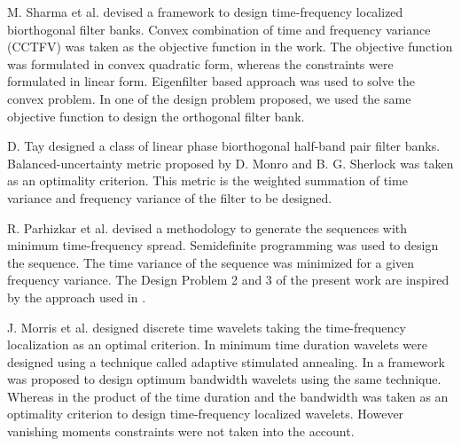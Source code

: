 M. Sharma et al. \cite{CSSP} devised a framework to design time-frequency localized biorthogonal filter banks. Convex combination of time and frequency variance (CCTFV) was taken as the objective function in the work. The objective function was formulated in convex quadratic form, whereas the constraints were formulated in linear form. Eigenfilter based approach was used to solve the convex problem. In one of the design problem proposed, we used the same objective function to design the orthogonal filter bank.

D. Tay \cite{key-2,key-28} designed a class of linear phase biorthogonal half-band pair filter banks. Balanced-uncertainty metric proposed by D. Monro and B. G. Sherlock \cite{key-4} was taken as an optimality criterion. This metric is the weighted summation of time variance and frequency variance of the filter to be designed. 

R. Parhizkar et al. \cite{key-40} devised a methodology to generate the sequences with minimum time-frequency spread. Semidefinite programming was used to design the sequence. The time variance of the sequence was minimized for a given frequency variance. The Design Problem 2 and 3 of the present work are inspired by the approach used in \cite{key-40}.

J. Morris et al. \cite{morris_time, morris_bw, morris_DB} designed discrete time wavelets taking the time-frequency localization as an optimal criterion. In \cite{morris_time} minimum time duration wavelets were designed using a technique called adaptive stimulated annealing. In \cite{morris_bw} a framework was proposed to design optimum bandwidth wavelets using the same technique. Whereas in \cite{morris_DB} the product of the time duration and the bandwidth was taken as an optimality criterion to design time-frequency localized wavelets. However vanishing moments constraints were not taken into the account.